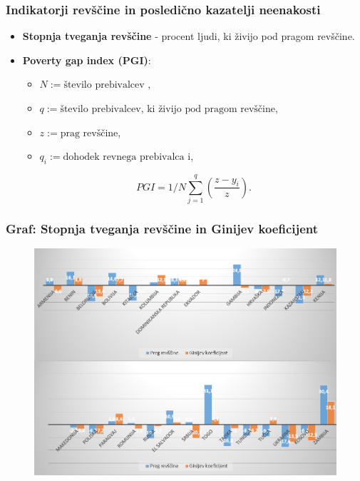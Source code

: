 \documentclass[10pt]{beamer}
\begin{document}
\begin{frame}
\frametitle{Indikatorji revščine in posledično kazatelji neenakosti}
\begin{itemize}
\item \textbf{Stopnja tveganja revščine} - procent ljudi, ki živijo pod pragom revščine.

\item \textbf{Poverty gap index (PGI)}:
\begin{itemize}
\item $N := \textrm{število prebivalcev}$ ,
\item $q := \textrm{število prebivalcev, ki živijo pod pragom revščine}$,
\item $z := \textrm{prag revščine}$,
\item $q_i := \textrm{dohodek revnega prebivalca i}$,
\end{itemize}
$$
PGI = 1/N \sum_{j=1}^q (\frac{z-y_i}{z}).
$$
\end{itemize}
\end{frame}


\begin{frame}
\frametitle{Graf: Stopnja tveganja revščine in Ginijev koeficijent}
\begin{figure}
\includegraphics[scale = 0.8]{./slike/gini_revscina.png}
\end{figure}

\end{frame}
\end{document}

